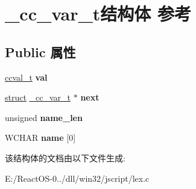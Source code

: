 \hypertarget{struct__cc__var__t}{}\section{\+\_\+cc\+\_\+var\+\_\+t结构体 参考}
\label{struct__cc__var__t}
\subsection*{Public 属性}
\begin{DoxyCompactItemize}
\item 
\mbox{\label{struct__cc__var__t_a5800f75306680a61f7c6ec2f2be20932}} 
\hyperlink{structccval__t}{ccval\+\_\+t} {\bfseries val}
\item 
\mbox{\label{struct__cc__var__t_a4c5561a49ebfb0fa5f81580cd65fe75a}} 
\hyperlink{interfacestruct}{struct} \hyperlink{struct__cc__var__t}{\+\_\+cc\+\_\+var\+\_\+t} $\ast$ {\bfseries next}
\item 
\mbox{\label{struct__cc__var__t_a9d613c435d989fc6d6f6e9a457815849}} 
unsigned {\bfseries name\+\_\+len}
\item 
\mbox{\label{struct__cc__var__t_a9ab7c02ac17d658cee85d8340260aa22}} 
W\+C\+H\+AR {\bfseries name} \mbox{[}0\mbox{]}
\end{DoxyCompactItemize}


该结构体的文档由以下文件生成\+:\begin{DoxyCompactItemize}
\item 
E\+:/\+React\+O\+S-\/0../dll/win32/jscript/lex.\+c\end{DoxyCompactItemize}
